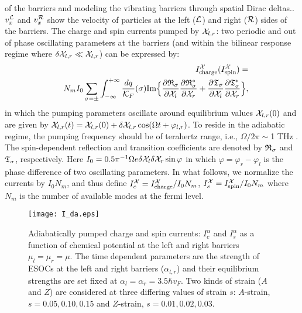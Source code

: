 \documentclass[doublecol]{epl2}
\begin{document}
of the barriers and modeling the vibrating barriers through spatial Dirac
deltas.\cite{cite:Titov07,cite:abdollahipour14}. $v_x^{\cal L}$
and $v_x^{\cal R}$ show the velocity of particles at the left
(${\cal L}$) and right (${\cal R}$) sides of the barriers. The
charge and spin currents pumped by ${\cal X}_{l,r}$: two
periodic and out of phase oscillating parameters at the barriers (and
within the bilinear response regime where $\delta {\cal X}_{l,r}\ll
{\cal X}_{l,r}$) can be expressed
by\cite{cite:Brouwer98,cite:abdollahipour14}:
\begin{eqnarray}
  &&I^{\cal X}_{\text{charge}}(I^{\cal X}_{\text{spin}})=
  \nonumber\\&&N_mI_0\sum_{\sigma=\pm}\int_{-\infty}^{+\infty}\frac{dq}{{\cal
  K}_F}(\sigma) \text{Im}\Big\{  \frac{\partial {\frak R}_{\sigma}}{\partial{{\cal X}_{l}}}
  \frac{\partial {\frak R}_{\sigma}^\ast}{\partial{{\cal
  X}_{r}}}+  \frac{\partial {\frak T}_{\sigma}}{\partial{{\cal X}_{l}}}
  \nonumber\frac{\partial {\frak T}_{\sigma}^\ast}{\partial{{\cal X}_{r}}}\Big\},\\
\end{eqnarray}
in which the pumping parameters oscillate around equilibrium values ${\cal X}_{l,r}(0)$ and are given by
${\cal X}_{l,r}(t)={\cal X}_{l,r}(0)+\delta{\cal X}_{l,r}\cos(\Omega t+\varphi_{l,r})$. To reside in the
adiabatic regime, the pumping frequency should be of terahertz range, i.e., $\Omega/2\pi\sim$1 THz
\cite{cite:Pradaprb09}. The spin-dependent reflection and transition coefficients are denoted by ${\frak
R}_{\sigma}$ and ${\frak T}_{\sigma}$, respectively. Here $I_0=0.5\pi^{-1}\Omega e \delta{\cal
X}_{l}\delta{\cal X}_{r}\sin\varphi$ in which $\varphi=\varphi_{r}-\varphi_{l}$ is the phase difference of two
oscillating parameters. In what follows, we normalize the currents by $I_0N_m$, and thus define $I^{\cal
X}_c=I^{\cal X}_\text{charge}/I_0N_m$, $I^{\cal X}_s=I^{\cal X}_\text{spin}/I_0N_m$ where $N_m$ is the number
of available modes at the fermi level.
\begin{figure}
\texttt{[image: I\_da.eps]}
\caption{\label{fig:I_da} Adiabatically pumped charge and spin
currents: $I^{\alpha}_c$ and $I^{\alpha}_s$ as a function of
chemical potential at the left and right barriers $\mu_l=\mu_r=\mu$.
The time dependent parameters are the strength of ESOCs at the left
and right barriers ($\alpha_{l,r}$) and their equilibrium strengths
are set fixed at $\alpha_l=\alpha_r=3.5\hbar v_F$. Two kinds of
strain ($A$ and $Z$) are considered at three differing values of
strain $s$: $A$-strain, $s=0.05, 0.10, 0.15$ and $Z$-strain,
$s=0.01, 0.02, 0.03$.}
\end{figure}
\end{document}
